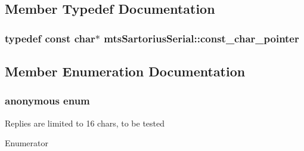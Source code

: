\subsection{Member Typedef Documentation}
\hypertarget{classmts_sartorius_serial_a84eee50d0f43b06e6adac9ae20f4f02c}{
\subsubsection[{const\-\_\-char\-\_\-pointer}]{\setlength{\rightskip}{0pt plus 5cm}typedef const char$\ast$ {\bf mts\-Sartorius\-Serial\-::const\-\_\-char\-\_\-pointer}\hspace{0.3cm}{\ttfamily [protected]}}}\label{classmts_sartorius_serial_a84eee50d0f43b06e6adac9ae20f4f02c}


\subsection{Member Enumeration Documentation}
\hypertarget{classmts_sartorius_serial_a3d845ebc5b0ea91a687044140a7b257a}{\subsubsection[{anonymous enum}]{\setlength{\rightskip}{0pt plus 5cm}anonymous enum\hspace{0.3cm}{\ttfamily [protected]}}}\label{classmts_sartorius_serial_a3d845ebc5b0ea91a687044140a7b257a}
Replies are limited to 16 chars, to be tested \begin{Desc}
\item[Enumerator]\par
\begin{description}
\item[{\em 
\hypertarget{classmts_sartorius_serial_a3d845ebc5b0ea91a687044140a7b257aa7a2c0b5e39b999002353c52f30f82d1f}{B\-U\-F\-F\-E\-R\-\_\-\-S\-I\-Z\-E}\label{classmts_sartorius_serial_a3d845ebc5b0ea91a687044140a7b257aa7a2c0b5e39b999002353c52f30f82d1f}
}]\end{description}
\end{Desc}


